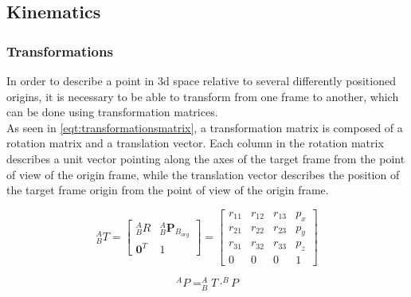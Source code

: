 \subsection{Kinematics}
\subsubsection{Transformations}
In order to describe a point in 3d space relative to several differently positioned origins, it is necessary to be able to transform from one frame to another, which can be done using transformation matrices. \\
As seen in \cref{eqt:transformationsmatrix}, a transformation matrix is composed of a rotation matrix and a translation vector. Each column in the rotation matrix describes a unit vector pointing along the axes of the target frame from the point of view of the origin frame, while the translation vector describes the position of the target frame origin from the point of view of the origin frame.

\begin{figure}[ht]
    \centering
    \begin{minipage}{0.55\textwidth}
        \centering
        \begin{equation}
            ^{A}_{B}T =
            \begin{bmatrix}
                ^{A}_{B}R & ^{A}_{B}\mathbf{P}_{B_{org}} \\
                \mathbf{0}^{T} & 1
            \end{bmatrix}
            =
            \begin{bmatrix}
                r_{11} & r_{12} & r_{13} & p_x \\
                r_{21} & r_{22} & r_{23} & p_y \\
                r_{31} & r_{32} & r_{33} & p_z \\
                0 & 0 & 0 & 1
            \end{bmatrix}
            \label{eqt:transformationsmatrix}
        \end{equation}
    \end{minipage}
    \hfill
    \centering
    \begin{minipage}{0.4\textwidth}
        \centering
        \begin{equation}
            ^{A}P = ^{A}_{B}T \cdot ^{B}P
            \label{eqt:transformation}
        \end{equation}
    \end{minipage}
\end{figure}
    
